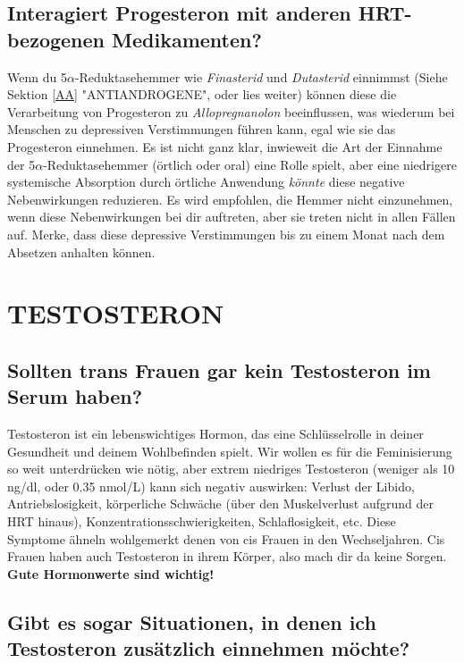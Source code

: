\documentclass{article}
\begin{document}
\subsection{Interagiert Progesteron mit anderen HRT-bezogenen Medikamenten?}\label{8-18}

Wenn du 5$\alpha$-Reduktasehemmer wie \textit{Finasterid} und \textit{Dutasterid} einnimmst (Siehe Sektion \ref{AA} "ANTIANDROGENE", oder lies weiter) können diese die Verarbeitung von Progesteron zu \textit{Allopregnanolon} beeinflussen, was wiederum bei Menschen zu depressiven Verstimmungen führen kann, egal wie sie das Progesteron einnehmen. Es ist nicht ganz klar, inwieweit die Art der Einnahme der 5$\alpha$-Reduktasehemmer (örtlich oder oral) eine Rolle spielt, aber eine niedrigere systemische Absorption durch örtliche Anwendung \textit{könnte }diese negative Nebenwirkungen reduzieren. Es wird empfohlen, die Hemmer nicht einzunehmen, wenn diese Nebenwirkungen bei dir auftreten, aber sie treten nicht in allen Fällen auf. Merke, dass diese depressive Verstimmungen bis zu einem Monat nach dem Absetzen anhalten können.

\section{TESTOSTERON}\label{T}

\subsection{Sollten trans Frauen \textbf{gar kein} Testosteron im Serum haben?}

Testosteron ist ein lebenswichtiges Hormon, das eine Schlüsselrolle in deiner Gesundheit und deinem Wohlbefinden spielt. Wir wollen es für die Feminisierung so weit unterdrücken wie nötig, aber extrem niedriges Testosteron (weniger als 10 ng/dl, oder 0.35 nmol/L) kann sich negativ auswirken: Verlust der Libido, Antriebslosigkeit, körperliche Schwäche (über den Muskelverlust aufgrund der HRT hinaus), Konzentrationsschwierigkeiten, Schlaflosigkeit, etc. Diese Symptome ähneln wohlgemerkt denen von cis Frauen in den Wechseljahren. Cis Frauen haben auch Testosteron in ihrem Körper, also mach dir da keine Sorgen. \textbf{Gute Hormonwerte sind wichtig!}

\subsection{Gibt es sogar Situationen, in denen ich Testosteron zusätzlich einnehmen möchte?}\label{9-2}
\end{document}

